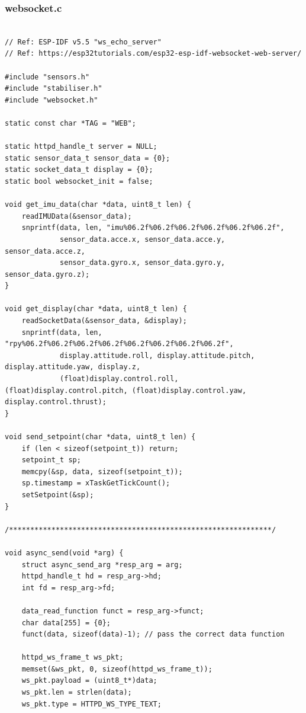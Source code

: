 \subsubsection{websocket.c}

\begin{lstlisting}[caption={websocket.c}]

// Ref: ESP-IDF v5.5 "ws_echo_server"
// Ref: https://esp32tutorials.com/esp32-esp-idf-websocket-web-server/

#include "sensors.h"
#include "stabiliser.h"
#include "websocket.h"

static const char *TAG = "WEB";

static httpd_handle_t server = NULL;
static sensor_data_t sensor_data = {0};
static socket_data_t display = {0};
static bool websocket_init = false;

void get_imu_data(char *data, uint8_t len) {
    readIMUData(&sensor_data);
    snprintf(data, len, "imu%06.2f%06.2f%06.2f%06.2f%06.2f%06.2f",
             sensor_data.acce.x, sensor_data.acce.y, sensor_data.acce.z,
             sensor_data.gyro.x, sensor_data.gyro.y, sensor_data.gyro.z);
}

void get_display(char *data, uint8_t len) {
    readSocketData(&sensor_data, &display);
    snprintf(data, len, "rpy%06.2f%06.2f%06.2f%06.2f%06.2f%06.2f%06.2f%06.2f",
             display.attitude.roll, display.attitude.pitch, display.attitude.yaw, display.z,
             (float)display.control.roll, (float)display.control.pitch, (float)display.control.yaw, display.control.thrust);
}

void send_setpoint(char *data, uint8_t len) {
    if (len < sizeof(setpoint_t)) return;
    setpoint_t sp;
    memcpy(&sp, data, sizeof(setpoint_t));
    sp.timestamp = xTaskGetTickCount();
    setSetpoint(&sp);
}

/**************************************************************/

void async_send(void *arg) {
    struct async_send_arg *resp_arg = arg;
    httpd_handle_t hd = resp_arg->hd;
    int fd = resp_arg->fd;

    data_read_function funct = resp_arg->funct; 
    char data[255] = {0};
    funct(data, sizeof(data)-1); // pass the correct data function

    httpd_ws_frame_t ws_pkt;
    memset(&ws_pkt, 0, sizeof(httpd_ws_frame_t));
    ws_pkt.payload = (uint8_t*)data;
    ws_pkt.len = strlen(data);
    ws_pkt.type = HTTPD_WS_TYPE_TEXT;


\end{lstlisting}
